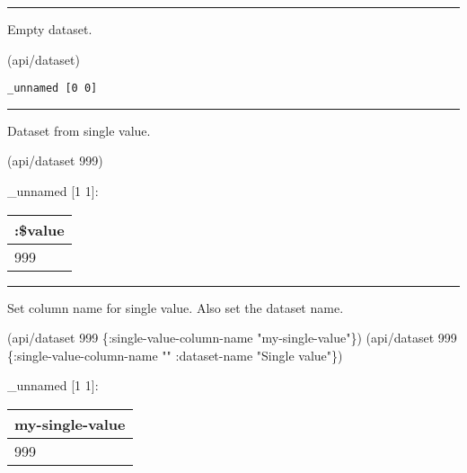 \documentclass[]{article}
\newenvironment{Shaded}{\begin{snugshade}}{\end{snugshade}}
\newcommand{\DecValTok}[1]{\textcolor[rgb]{0.00,0.00,0.81}{#1}}
\newcommand{\StringTok}[1]{\textcolor[rgb]{0.31,0.60,0.02}{#1}}
\newcommand{\AttributeTok}[1]{\textcolor[rgb]{0.77,0.63,0.00}{#1}}
\newcommand{\NormalTok}[1]{#1}
\begin{document}
\begin{center}\rule{0.5\linewidth}{0.5pt}\end{center}

Empty dataset.

\begin{Shaded}
\begin{Highlighting}[]
\NormalTok{(api/dataset)}
\end{Highlighting}
\end{Shaded}

\begin{verbatim}
_unnamed [0 0]
\end{verbatim}

\begin{center}\rule{0.5\linewidth}{0.5pt}\end{center}

Dataset from single value.

\begin{Shaded}
\begin{Highlighting}[]
\NormalTok{(api/dataset }\DecValTok{999}\NormalTok{)}
\end{Highlighting}
\end{Shaded}

\_unnamed {[}1 1{]}:

\begin{longtable}[]{@{}l@{}}
\toprule
:\$value\tabularnewline
\midrule
\endhead
999\tabularnewline
\bottomrule
\end{longtable}

\begin{center}\rule{0.5\linewidth}{0.5pt}\end{center}

Set column name for single value. Also set the dataset name.

\begin{Shaded}
\begin{Highlighting}[]
\NormalTok{(api/dataset }\DecValTok{999}\NormalTok{ \{}\AttributeTok{:single-value-column-name} \StringTok{"my-single-value"}\NormalTok{\})}
\NormalTok{(api/dataset }\DecValTok{999}\NormalTok{ \{}\AttributeTok{:single-value-column-name} \StringTok{""}
                  \AttributeTok{:dataset-name} \StringTok{"Single value"}\NormalTok{\})}
\end{Highlighting}
\end{Shaded}

\_unnamed {[}1 1{]}:

\begin{longtable}[]{@{}l@{}}
\toprule
my-single-value\tabularnewline
\midrule
\endhead
999\tabularnewline
\bottomrule
\end{longtable}
\end{document}
